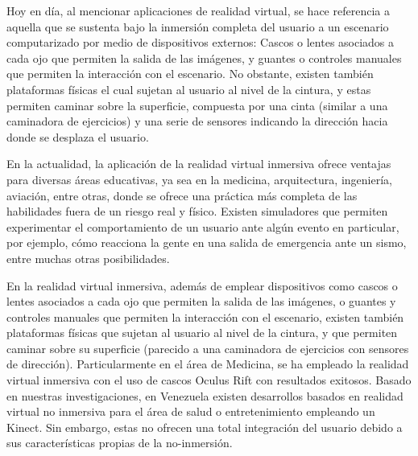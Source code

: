 \documentclass[conference]{IEEEtran}
\begin{document}



Hoy en día, al mencionar aplicaciones de realidad virtual, se hace referencia a aquella que se sustenta bajo la inmersión completa del usuario a un escenario computarizado por medio de dispositivos externos: Cascos o lentes asociados a cada ojo que permiten la salida de las imágenes, y guantes o controles manuales que permiten la interacción con el escenario. No obstante, existen también plataformas físicas el cual sujetan al usuario al nivel de la cintura, y estas permiten caminar sobre la superficie, compuesta por una cinta (similar a una caminadora de ejercicios) y una serie de sensores indicando la dirección hacia donde se desplaza el usuario.

En la actualidad, la aplicación de la realidad virtual inmersiva ofrece ventajas para diversas áreas educativas, ya sea en la medicina, arquitectura, ingeniería, aviación, entre otras, donde se ofrece una práctica más completa de las habilidades fuera de un riesgo real y físico. Existen simuladores que permiten experimentar el comportamiento de un usuario ante algún evento en particular, por ejemplo, cómo reacciona la gente en una salida de emergencia ante un sismo, entre muchas otras posibilidades.

En la realidad virtual inmersiva, además de emplear dispositivos como cascos o lentes asociados a cada ojo que permiten la salida de las imágenes, o guantes y controles manuales que permiten la interacción con el escenario, existen también plataformas físicas que sujetan al usuario al nivel de la cintura, y que permiten caminar sobre su superficie (parecido a una caminadora de ejercicios con sensores de dirección). Particularmente en el área de Medicina, se ha empleado la realidad virtual inmersiva con el uso de cascos Oculus Rift \cite{ Juanes, XU2015721, Bolton, 7136687} con resultados exitosos. Basado en nuestras investigaciones, en Venezuela existen desarrollos basados en realidad virtual no inmersiva para el área de salud \cite{RAM13} o entretenimiento \cite{ RAM15} empleando un Kinect. Sin embargo, estas no ofrecen una total integración del usuario debido a sus características propias de la no-inmersión. 
\end{document}
